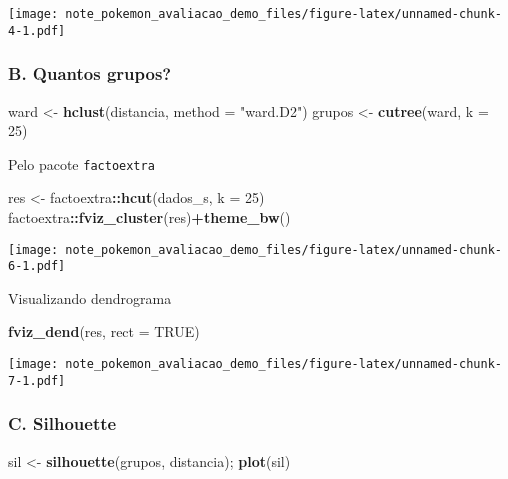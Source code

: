 \documentclass[]{article}
\newenvironment{Shaded}{\begin{snugshade}}{\end{snugshade}}
\newcommand{\DataTypeTok}[1]{\textcolor[rgb]{0.13,0.29,0.53}{#1}}
\newcommand{\DecValTok}[1]{\textcolor[rgb]{0.00,0.00,0.81}{#1}}
\newcommand{\KeywordTok}[1]{\textcolor[rgb]{0.13,0.29,0.53}{\textbf{#1}}}
\newcommand{\NormalTok}[1]{#1}
\newcommand{\OperatorTok}[1]{\textcolor[rgb]{0.81,0.36,0.00}{\textbf{#1}}}
\newcommand{\OtherTok}[1]{\textcolor[rgb]{0.56,0.35,0.01}{#1}}
\newcommand{\StringTok}[1]{\textcolor[rgb]{0.31,0.60,0.02}{#1}}
\begin{document}
\texttt{[image: note\_pokemon\_avaliacao\_demo\_files/figure-latex/unnamed-chunk-4-1.pdf]}

\hypertarget{b.-quantos-grupos}{%
\subsubsection{B. Quantos grupos?}\label{b.-quantos-grupos}}

\begin{Shaded}
\begin{Highlighting}[]
\NormalTok{ward <-}\StringTok{ }\KeywordTok{hclust}\NormalTok{(distancia, }\DataTypeTok{method =} \StringTok{"ward.D2"}\NormalTok{)}
\NormalTok{grupos <-}\StringTok{ }\KeywordTok{cutree}\NormalTok{(ward, }\DataTypeTok{k =} \DecValTok{25}\NormalTok{)}
\end{Highlighting}
\end{Shaded}

Pelo pacote \texttt{factoextra}

\begin{Shaded}
\begin{Highlighting}[]
\NormalTok{res <-}\StringTok{ }\NormalTok{factoextra}\OperatorTok{::}\KeywordTok{hcut}\NormalTok{(dados_s, }\DataTypeTok{k =} \DecValTok{25}\NormalTok{)}
\NormalTok{factoextra}\OperatorTok{::}\KeywordTok{fviz_cluster}\NormalTok{(res)}\OperatorTok{+}\KeywordTok{theme_bw}\NormalTok{()}
\end{Highlighting}
\end{Shaded}

\texttt{[image: note\_pokemon\_avaliacao\_demo\_files/figure-latex/unnamed-chunk-6-1.pdf]}

Visualizando dendrograma

\begin{Shaded}
\begin{Highlighting}[]
\KeywordTok{fviz_dend}\NormalTok{(res, }\DataTypeTok{rect =} \OtherTok{TRUE}\NormalTok{)}
\end{Highlighting}
\end{Shaded}

\texttt{[image: note\_pokemon\_avaliacao\_demo\_files/figure-latex/unnamed-chunk-7-1.pdf]}

\hypertarget{c.-silhouette}{%
\subsubsection{C. Silhouette}\label{c.-silhouette}}

\begin{Shaded}
\begin{Highlighting}[]
\NormalTok{sil <-}\StringTok{ }\KeywordTok{silhouette}\NormalTok{(grupos, distancia); }\KeywordTok{plot}\NormalTok{(sil)}
\end{Highlighting}
\end{Shaded}
\end{document}
